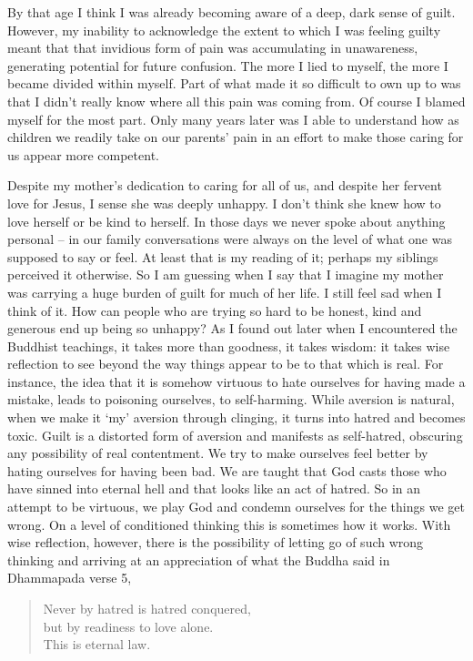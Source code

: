 By that age I think I was already becoming aware of a deep, dark sense
of guilt. However, my inability to acknowledge the extent to which I was
feeling guilty meant that that invidious form of pain was accumulating
in unawareness, generating potential for future confusion. The more I
lied to myself, the more I became divided within myself. Part of what
made it so difficult to own up to was that I didn't really know where
all this pain was coming from. Of course I blamed myself for the most
part. Only many years later was I able to understand how as children we
readily take on our parents' pain in an effort to make those caring for
us appear more competent.

Despite my mother's dedication to caring for all of us, and despite her
fervent love for Jesus, I sense she was deeply unhappy. I don't
think she knew how to love herself or be kind to herself. In those days we never spoke about anything personal -- in our family conversations were always on the level of what one was supposed to say or feel. At least that is my
reading of it; perhaps my siblings perceived it otherwise. So I am
guessing when I say that I imagine my mother was carrying a huge burden
of guilt for much of her life. I still feel sad when I think of it. How
can people who are trying so hard to be honest, kind and generous end up
being so unhappy? As I found out later when I encountered the Buddhist
teachings, it takes more than goodness, it takes wisdom: it takes wise
reflection to see beyond the way things appear to be to that which is
real. For instance, the idea that it is somehow virtuous to hate
ourselves for having made a mistake, leads to poisoning ourselves, to
self-harming. While aversion is natural, when we make it `my' aversion
through clinging, it turns into hatred and becomes toxic. Guilt is a
distorted form of aversion and manifests as self-hatred, obscuring any
possibility of real contentment. We try to make ourselves feel better by
hating ourselves for having been bad. We are taught that God casts those
who have sinned into eternal hell and that looks like an act of hatred.
So in an attempt to be virtuous, we play God and condemn ourselves for
the things we get wrong. On a level of conditioned thinking this is
sometimes how it works. With wise reflection, however, there is the
possibility of letting go of such wrong thinking and arriving at an
appreciation of what the Buddha said in Dhammapada verse 5,

\enlargethispage{\baselineskip}

\begin{quote}
  Never by hatred is hatred conquered,\\
  but by readiness to love alone.\\
  This is eternal law.\cite{dhammapada}
\end{quote}

